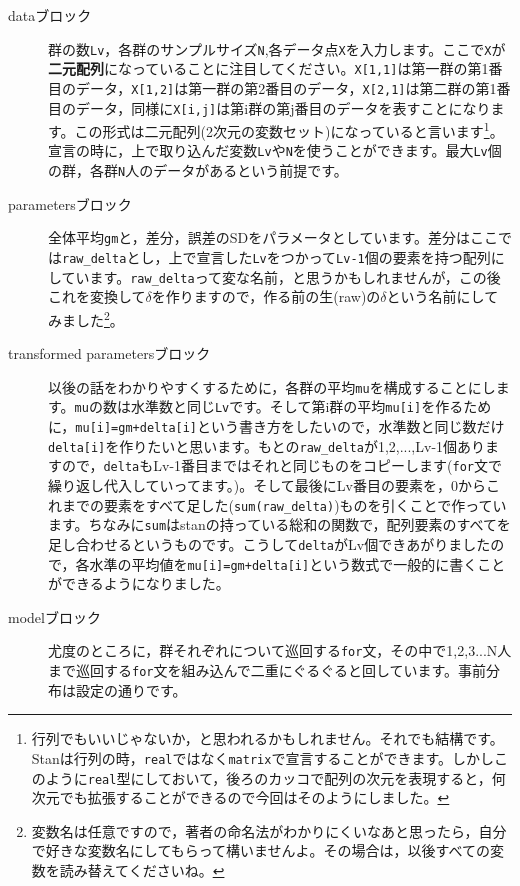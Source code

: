 \begin{description}
	\item[dataブロック] 群の数\verb|Lv|，各群のサンプルサイズ\verb|N|,各データ点\verb|X|を入力します。ここで\verb|X|が\textbf{二元配列}になっていることに注目してください。\verb|X[1,1]|は第一群の第1番目のデータ，\verb|X[1,2]|は第一群の第2番目のデータ，\verb|X[2,1]|は第二群の第1番目のデータ，同様に\verb|X[i,j]|は第i群の第j番目のデータを表すことになります。この形式は二元配列(2次元の変数セット)になっていると言います\footnote{行列でもいいじゃないか，と思われるかもしれません。それでも結構です。Stanは行列の時，\verb|real|ではなく\verb|matrix|で宣言することができます。しかしこのように\verb|real|型にしておいて，後ろのカッコで配列の次元を表現すると，何次元でも拡張することができるので今回はそのようにしました。}。宣言の時に，上で取り込んだ変数\verb|Lv|や\verb|N|を使うことができます。最大\verb|Lv|個の群，各群\verb|N|人のデータがあるという前提です。
	\item[parametersブロック] 全体平均\verb|gm|と，差分，誤差のSDをパラメータとしています。差分はここでは\verb|raw_delta|とし，上で宣言した\verb|Lv|をつかって\verb|Lv-1|個の要素を持つ配列にしています。\verb|raw_delta|って変な名前，と思うかもしれませんが，この後これを変換して$\delta$を作りますので，作る前の生(raw)の$\delta$という名前にしてみました\footnote{変数名は任意ですので，著者の命名法がわかりにくいなあと思ったら，自分で好きな変数名にしてもらって構いませんよ。その場合は，以後すべての変数を読み替えてくださいね。}。
	\item[transformed parametersブロック] 以後の話をわかりやすくするために，各群の平均\verb|mu|を構成することにします。\verb|mu|の数は水準数と同じ\verb|Lv|です。そして第i群の平均\verb|mu[i]|を作るために，\verb|mu[i]=gm+delta[i]|という書き方をしたいので，水準数と同じ数だけ\verb|delta[i]|を作りたいと思います。もとの\verb|raw_delta|が1,2,...,Lv-1個ありますので，\verb|delta|もLv-1番目まではそれと同じものをコピーします(\verb|for|文で繰り返し代入していってます。)。そして最後にLv番目の要素を，0からこれまでの要素をすべて足した(\verb|sum(raw_delta)|)ものを引くことで作っています。ちなみに\verb|sum|はstanの持っている総和の関数で，配列要素のすべてを足し合わせるというものです。こうして\verb|delta|がLv個できあがりましたので，各水準の平均値を\verb|mu[i]=gm+delta[i]|という数式で一般的に書くことができるようになりました。
	\item[modelブロック] 尤度のところに，群それぞれについて巡回する\verb|for|文，その中で1,2,3...N人まで巡回する\verb|for|文を組み込んで二重にぐるぐると回しています。事前分布は設定の通りです。
\end{description}
